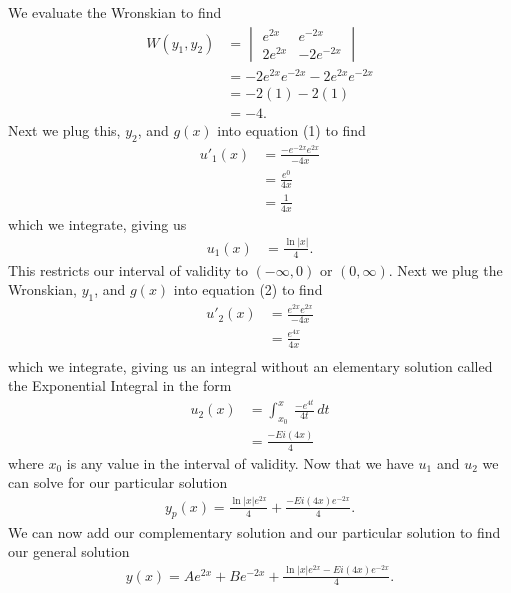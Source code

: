 \documentclass{article}
\begin{document}
We evaluate the Wronskian to find
\begin{align*}
    W(y_1, y_2) &= \begin{vmatrix}
    e^{2x} & e^{-2x} \\
    2e^{2x} & -2e^{-2x}
    \end{vmatrix} \\
    &= -2e^{2x}e^{-2x} - 2e^{2x}e^{-2x} \\
    &= -2(1)-2(1) \\
    &= -4.
\end{align*}
Next we plug this, $y_2$, and $g(x)$ into equation (1) to find
\begin{align*}
u'_1(x) &= \frac{-e^{-2x}e^{2x}}{-4x} \\
&= \frac{e^{0}}{4x} \\
&= \frac{1}{4x}
\end{align*}
which we integrate, giving us
\begin{align*}
u_1(x) &= \frac{\ln{\lvert x \rvert}}{4}.
\end{align*}
This restricts our interval of validity to $(-\infty,0)$ or $(0,\infty)$.
Next we plug the Wronskian, $y_1$, and $g(x)$ into equation (2) to find
\begin{align*}
u'_2(x) &= \frac{e^{2x}e^{2x}}{-4x} \\
&= \frac{e^{4x}}{4x} \\
\end{align*}
which we integrate, giving us an integral without an elementary solution called the Exponential Integral in the form
\begin{align*}
u_2(x) &= \int_{x_0}^{x} \ \frac{-e^{4t}}{4t}  \,dt \\
&= \frac{-Ei(4x)}{4}  
\end{align*}
where $x_0$ is any value in the interval of validity. Now that we have $u_1$ and $u_2$ we can solve for our particular solution
\begin{align*}
y_p(x) = \frac{\ln{\lvert x \rvert} e^{2x}}{4}+ \frac{-Ei(4x)e^{-2x}}{4}.
\end{align*}
We can now add our complementary solution and our particular solution to find our general solution
\begin{align*}
y(x) =  Ae^{2x}+Be^{-2x} + \frac{\ln{\lvert x \rvert} e^{2x}-Ei(4x)e^{-2x}}{4}.
\end{align*}
\end{document}
